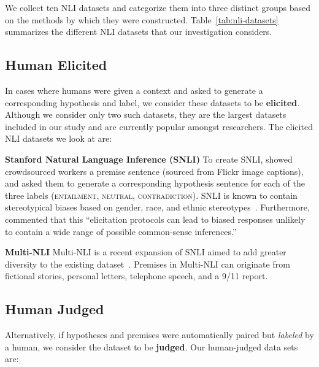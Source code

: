 We collect ten NLI datasets and categorize them into three distinct groups based on the methods by which they were constructed.  Table~\ref{tab:nli-datasets} summarizes the different NLI datasets that our investigation considers.

\subsection{Human Elicited} In cases where humans were given a context and asked to generate a corresponding hypothesis and label, we consider these datasets to be \textbf{elicited}.   Although we consider only two such datasets, they are the largest datasets included in our study and are currently popular amongst researchers.  The elicited NLI datasets we look at are:

\begin{datalist}
\item[] \textbf{Stanford Natural Language Inference (SNLI)} To create SNLI,
 showed crowdsourced workers a premise sentence (sourced from Flickr image captions), and asked them to generate a corresponding hypothesis sentence for each of the three labels (\textsc{entailment}, \textsc{neutral}, \textsc{contradiction}).  SNLI is known to contain stereotypical biases based on gender, race, and ethnic stereotypes~\cite{social-bias-in-elicited-natural-language-inferences}. Furthermore,  commented that this ``elicitation protocols can lead to biased responses unlikely to contain a wide range of possible common-sense inferences.''

\item[] \textbf{Multi-NLI}
Multi-NLI is a recent expansion of SNLI aimed to add greater diversity to the existing dataset~\cite{williams2017broad}. Premises in Multi-NLI can originate from fictional stories, personal letters, telephone speech, and a 9/11 report.

\end{datalist}

\subsection{Human Judged} Alternatively, if hypotheses and premises were automatically paired but \emph{labeled} by a human, we consider the dataset to be \textbf{judged}.  Our human-judged data sets are:

